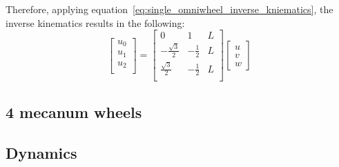 Therefore, applying equation~\ref{eq:single_omniwheel_inverse_kniematics}, the inverse kinematics results in the following: 
\begin{equation}
\left[
\begin{array}{c}
u_0 \\
u_1 \\
u_2 \\
\end{array}
\right]
=
\left[
\begin{array}{ccc}
 0      & 1     & L \\
-\frac{\sqrt{3}}{2} & -\frac{1}{2} & L \\
 \frac{\sqrt{3}}{2} & -\frac{1}{2} & L \\
\end{array}
\right]
\left[
\begin{array}{c}
 u \\
 v \\
 w
\end{array}
\right]
\end{equation}



\subsection{4 mecanum wheels}


\subsection{Dynamics}


